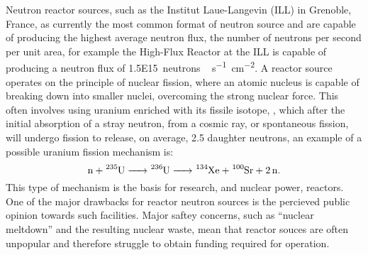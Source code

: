 Neutron reactor sources, such as the Institut Laue-Langevin (ILL) in Grenoble, France, as currently the most common format of neutron source and are capable of producing the highest average neutron flux, the number of neutrons per second per unit area, for example the High-Flux Reactor at the ILL is capable of producing a neutron flux of \SI{1.5E15}{neutrons\,\second^{-1}\centi\meter^{-2}}.\cite{ill2016} A reactor source operates on the principle of nuclear fission, where an atomic nucleus is capable of breaking down into smaller nuclei, overcoming the strong nuclear force. This often involves using uranium enriched with its fissile isotope, , which after the initial absorption of a stray neutron, from a cosmic ray, or spontaneous fission, will undergo fission to release, on average, 2.5 daughter neutrons, an example of a possible uranium fission mechanism is:
%
\begin{equation*}
	\ce{n + ^{235}U -> ^{236}U -> ^{134}Xe + ^{100}Sr + 2n}.
\end{equation*}
%
This type of mechanism is the basis for research, and nuclear power, reactors.\cite{Sivia2011} One of the major drawbacks for reactor neutron sources is the percieved public opinion towards such facilities. Major saftey concerns, such as ``nuclear meltdown'' and the resulting nuclear waste, mean that reactor souces are often unpopular and therefore struggle to obtain funding required for operation.

